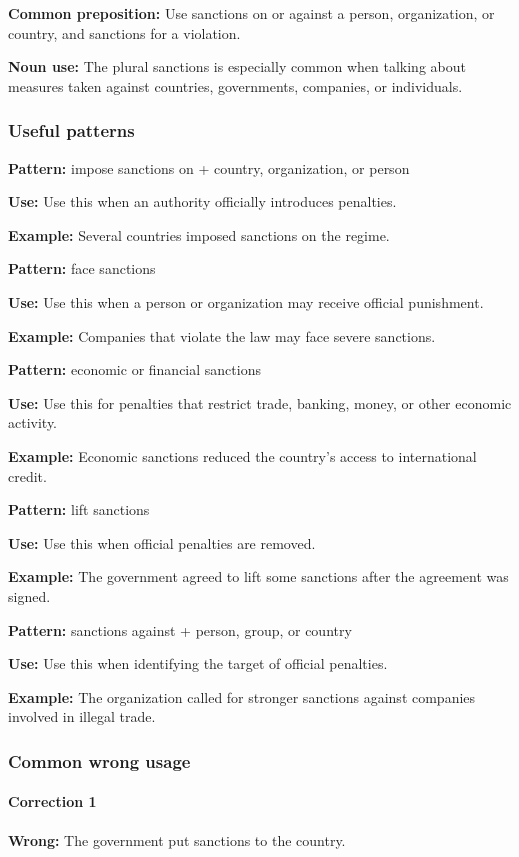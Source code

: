\documentclass[11pt]{article}
\begin{document}
\textbf{Common preposition:} Use sanctions on or against a person, organization, or country, and sanctions for a violation.

\textbf{Noun use:} The plural sanctions is especially common when talking about measures taken against countries, governments, companies, or individuals.

\subsubsection{Useful patterns}
\textbf{Pattern:} impose sanctions on + country, organization, or person

\textbf{Use:} Use this when an authority officially introduces penalties.

\textbf{Example:} Several countries imposed sanctions on the regime.

\textbf{Pattern:} face sanctions

\textbf{Use:} Use this when a person or organization may receive official punishment.

\textbf{Example:} Companies that violate the law may face severe sanctions.

\textbf{Pattern:} economic or financial sanctions

\textbf{Use:} Use this for penalties that restrict trade, banking, money, or other economic activity.

\textbf{Example:} Economic sanctions reduced the country's access to international credit.

\textbf{Pattern:} lift sanctions

\textbf{Use:} Use this when official penalties are removed.

\textbf{Example:} The government agreed to lift some sanctions after the agreement was signed.

\textbf{Pattern:} sanctions against + person, group, or country

\textbf{Use:} Use this when identifying the target of official penalties.

\textbf{Example:} The organization called for stronger sanctions against companies involved in illegal trade.

\subsubsection{Common wrong usage}
\paragraph{Correction 1}
\textbf{Wrong:} The government put sanctions to the country.
\end{document}
